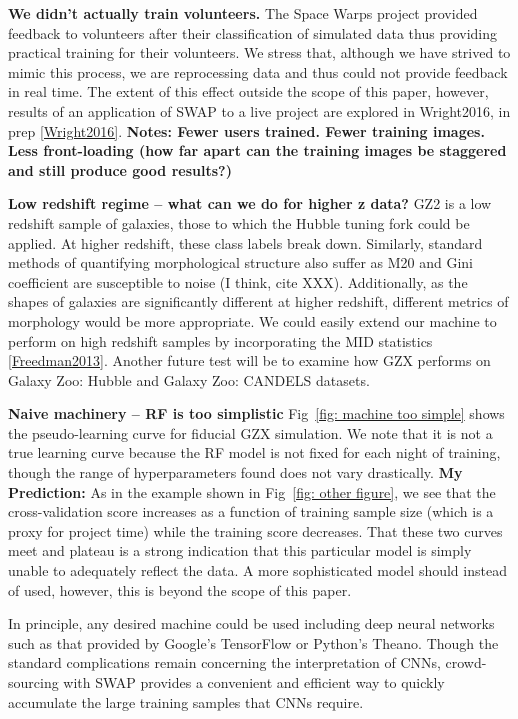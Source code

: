 \documentclass[twocolumn]{aastex6}
\begin{document}
\textbf{We didn't actually train volunteers.}
The Space Warps project provided feedback to volunteers after their classification
of simulated data thus providing practical training for their volunteers. We stress 
that, although we have strived to mimic this process, we are reprocessing data and
thus could not provide feedback in real time. The extent of this effect outside the scope
of this paper, however, results of an application of SWAP to a live project 
are explored in Wright2016, in prep \ref{Wright2016}. 
\textbf{Notes: Fewer users trained. Fewer training images. 
Less front-loading (how far apart can the training images be staggered and still produce good results?)}


\textbf{Low redshift regime -- what can we do for higher z data?}
GZ2 is a low redshift sample of galaxies, those to which the Hubble tuning fork 
could be applied. At higher redshift, these class labels break down. 
Similarly, standard methods of quantifying morphological structure also 
suffer as M20 and Gini coefficient are susceptible to noise (I think, cite XXX).
Additionally, as the shapes of galaxies are significantly different at higher 
redshift, different metrics of morphology would be more appropriate. 
We could easily extend our machine to perform on high redshift samples
by incorporating the MID statistics \ref{Freedman2013}. Another future
test will be to examine how GZX performs on Galaxy Zoo: Hubble and 
Galaxy Zoo: CANDELS datasets. 

\textbf{Naive machinery -- RF is too simplistic}
Fig~\ref{fig: machine too simple} shows the pseudo-learning curve for fiducial
GZX simulation. We note that it is not a true learning curve because the RF 
model is not fixed for each night of training, though the range of hyperparameters
found does not vary drastically. \textbf{My Prediction:} As in the example shown
in Fig~\ref{fig: other figure}, we see that the cross-validation score increases as a
function of training sample size (which is a proxy for project time) while the training score decreases. 
That these two curves meet and plateau is a strong indication that this particular
model is simply unable to adequately reflect the data. A more sophisticated model 
should instead of used, however, this is beyond the scope of this paper. 

In principle, any desired machine could be used including deep neural networks such 
as that provided by Google's TensorFlow or Python's Theano. Though the standard 
complications remain concerning the interpretation of CNNs, crowd-sourcing with
SWAP provides a convenient and efficient way to quickly accumulate the large training 
samples that CNNs require.  
\end{document}
